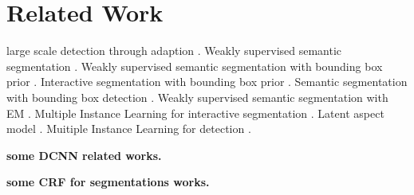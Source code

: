 \section{Related Work}
large scale detection through adaption \citep{Hoffman14Lsda}. 
Weakly supervised semantic segmentation \citep{xu2014tell, LiICML2014, vezhnevets2010towards, vezhnevets2011weakly, vezhnevets2012weakly}.
Weakly supervised semantic segmentation with bounding box prior \citep{kuettel2012segmentation}. Interactive segmentation with bounding box prior \citep{lempitsky2009image}.
Semantic segmentation with bounding box detection \citep{xia2013semantic}.
Weakly supervised semantic segmentation with EM \citep{duygulu2002object}.
Multiple Instance Learning for interactive segmentation \citep{WuMilcut}. 
Latent aspect model \citep{verbeek2007region}.
Muitiple Instance Learning for detection \citep{aliconfidence, papandreou2014untangling, song2014learning}.

{\bf{some DCNN related works.}}

{\bf{some CRF for segmentations works.}}


